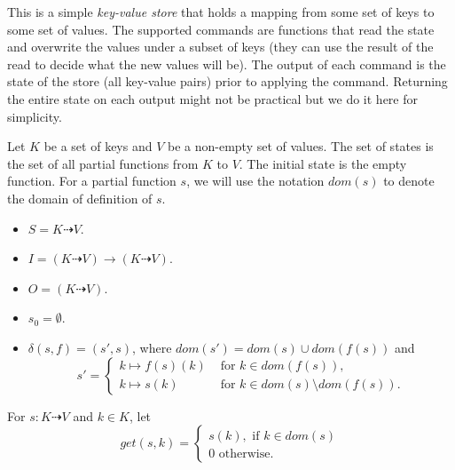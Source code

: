 \documentclass[12pt,a4paper,en]{pracamgr}
\newcommand{\ti}[1]{\textit{#1}}
\begin{document}
\begin{ex}\label{kv-sm}
    This is a simple \ti{key-value store} that holds a mapping from some set of keys to some set of values. The supported commands are functions that read the state and overwrite the values under a subset of keys (they can use the result of the read to decide what the new values will be). The output of each command is the state of the store (all key-value pairs) prior to applying the command. Returning the entire state on each output might not be practical but we do it here for simplicity.

	Let $K$ be a set of keys and $V$ be a non-empty set of values. The set of states is the set of all partial functions from $K$ to $V$. The initial state is the empty function.
    For a partial function $s$, we will use the notation $dom(s)$ to denote the domain of definition of $s$.
	\begin{itemize}
		\item $S = K \dashrightarrow V$.
        \item $I = (K \dashrightarrow V) \rightarrow (K \dashrightarrow V)$.
        \item $O = (K \dashrightarrow V)$.
		\item $s_0 = \emptyset$.
        \item $\delta(s, f) = (s', s)$, where $dom(s') = dom(s) \cup dom(f(s))$ and
            $$ s' = \begin{cases} k \mapsto f(s)(k)&\text{ for } k \in dom(f(s)), \\ k \mapsto s(k)&\text{ for } k \in dom(s) \setminus dom(f(s)). \end{cases} $$
	\end{itemize}

    For $s: K \dashrightarrow V$ and $k \in K$, let
    $$ get(s, k) = \begin{cases} s(k),\text{ if }k \in dom(s)\\0\text{ otherwise.}\end{cases} $$


\end{ex}
\end{document}
